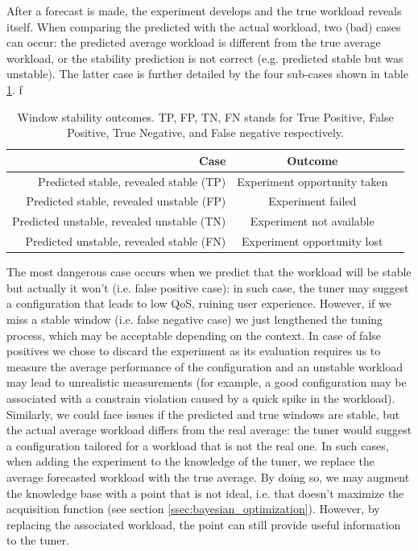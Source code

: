 \documentclass[a4paper, 12pt]{article} %
\newcommand{\ra}[1]{\renewcommand{\arraystretch}{#1}}
\begin{document}
	 After a forecast is made, the experiment develops and the true workload reveals itself. When comparing the predicted with the actual workload, two (bad) cases can occur: the predicted average workload is different from the true average workload, or the stability prediction is not correct (e.g. predicted stable but was unstable). The latter case is further detailed by the four sub-cases shown in table \ref{table:stability_cases}. 	 
	 f\begin{table}\centering 
	 	\ra{1.3}
	 	\begin{tabular*}{\textwidth}{@{}rcr@{}}
	 		\toprule
	 		Case & Outcome\\
	 		\midrule
	 		Predicted stable, revealed stable (TP) & Experiment opportunity taken\\
	 		Predicted stable, revealed unstable (FP)& Experiment failed\\
	 		Predicted unstable, revealed unstable (TN)& Experiment not available\\
	 		Predicted unstable, revealed stable (FN)& Experiment opportunity lost\\
	 		\bottomrule
	 	\end{tabular*}
	 	\caption{Window stability outcomes. TP, FP, TN, FN stands for True Positive, False Positive, True Negative, and False negative respectively.} \label{table:stability_cases}
	 \end{table}
	 The most dangerous case occurs when we predict that the workload will be stable but actually it won't (i.e. false positive case): in such case, the tuner may suggest a configuration that leads to low QoS, ruining user experience. However, if we miss a stable window (i.e. false negative case) we just lengthened the tuning process, which may be acceptable depending on the context.
	 In case of false positives we chose to discard the experiment as its evaluation requires us to measure the average performance of the configuration and an unstable workload may lead to unrealistic measurements (for example, a good configuration may be associated with a constrain violation caused by a quick spike in the workload).\\
	 Similarly, we could face issues if the predicted and true windows are stable, but the actual average workload differs from the real average: the tuner would suggest a configuration tailored for a workload that is not the real one. In such cases, when adding the experiment to the knowledge of the tuner, we replace the average forecasted workload with the true average. By doing so, we may augment the knowledge base with a point that is not ideal, i.e. that doesn't maximize the acquisition function (see section \ref{ssec:bayesian_optimization}). However, by replacing the associated workload, the point can still provide useful information to the tuner.
	 
\end{document}
